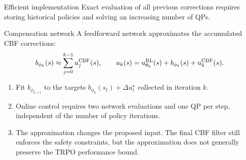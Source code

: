 \documentclass[aspectratio=169,10pt]{beamer}
\newcommand{\pos}[1]{\textcolor{positive}{#1}}
\begin{document}
\begin{frame}{Efficient implementation}
Exact evaluation of all previous corrections requires storing historical policies and solving an increasing number of QPs.
\vspace{.6em}
\begin{block}{Compensation network}
A feedforward network approximates the accumulated CBF corrections:
\begin{equation}
b_{\phi_k}(s)\approx\sum_{j=0}^{k-1}u_j^{\rm CBF}(s),\qquad
u_k(s)=u^{\rm RL}_{\theta_k}(s)+b_{\phi_k}(s)+u_k^{\rm CBF}(s).
\end{equation}
\end{block}
\vspace{.5em}
\begin{enumerate}\setlength\itemsep{.6em}
\item Fit $b_{\phi_{k+1}}$ to the targets $b_{\phi_k}(s_t)+\Delta u_t^\star$ collected in iteration $k$.
\item Online control requires \pos{two network evaluations and one QP per step}, independent of the number of policy iterations.
\item The approximation changes the proposed input. The final CBF filter still enforces the safety constraints, but the approximation does not generally preserve the TRPO performance bound.
\end{enumerate}
\end{frame}
\end{document}
